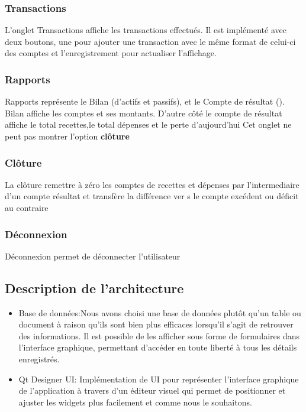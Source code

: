 \documentclass[10pt,a4paper,openany]{report}
\begin{document}
	\subsubsection{Transactions}
	L'onglet Transactions affiche les transactions effectués. Il est implémenté avec deux boutons, une pour ajouter une transaction avec le même format de celui-ci des comptes et l'enregistrement pour actualiser l'affichage.
	
	\subsubsection{Rapports}
	Rapports représente le Bilan (d'actifs et passifs), et le Compte de résultat (). Bilan affiche les comptes et ses montants. D'autre côté le compte de résultat affiche le total recettes,le total dépenses et le perte d'aujourd'hui
	Cet onglet ne peut pas montrer l'option \textbf{clôture}
	
	\subsubsection{Clôture}
	La clôture remettre à zéro les comptes de recettes et dépenses par l'intermediaire d'un compte résultat et transfère la différence ver s le compte excédent ou déficit au contraire
	\subsubsection{Déconnexion}
	Déconnexion permet de déconnecter l'utilisateur
	
	
	\subsection{Description de l'architecture}
	
	\begin{itemize}
		\item Base de données:Nous avons choisi une base de données plutôt qu'un table ou document à raison qu'ils sont bien plus efficaces lorsqu'il s'agit de retrouver des informations. Il est possible de les afficher sous forme de formulaires dans l'interface graphique, permettant d'accéder en toute liberté à tous les détails enregistrés.
		\item Qt Designer UI: Implémentation de UI pour représenter l'interface graphique de l'application à travers d'un éditeur visuel qui permet de positionner et ajuster les widgets plus facilement et comme nous le souhaitons.

	\end{itemize}
	
\end{document}
